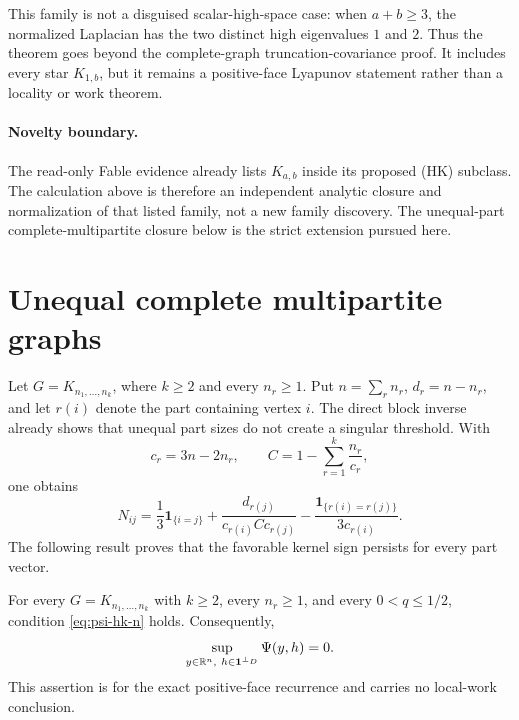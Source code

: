 \documentclass[11pt]{article}
\begin{document}
This family is not a disguised scalar-high-space case: when $a+b\geq3$, the
normalized Laplacian has the two distinct high eigenvalues $1$ and $2$.
Thus the theorem goes beyond the complete-graph truncation-covariance proof.
It includes every star $K_{1,b}$, but it remains a positive-face Lyapunov
statement rather than a locality or work theorem.

\paragraph{Novelty boundary.}
The read-only Fable evidence already lists $K_{a,b}$ inside its proposed
\textup{(HK)} subclass.  The calculation above is therefore an independent
analytic closure and normalization of that listed family, not a new family
discovery.  The unequal-part complete-multipartite closure below is the
strict extension pursued here.

\section{Unequal complete multipartite graphs}

Let $G=K_{n_1,\ldots,n_k}$, where $k\geq2$ and every $n_r\geq1$.  Put
$n=\sum_r n_r$, $d_r=n-n_r$, and let $r(i)$ denote the part containing
vertex $i$.  The direct block inverse already shows that unequal part sizes
do not create a singular threshold.  With
\begin{equation}
 c_r=3n-2n_r,
 \qquad
 C=1-\sum_{r=1}^k\frac{n_r}{c_r},
 \label{eq:psi-kmultipartite-block-parameters}
\end{equation}
one obtains
\begin{equation}
 N_{ij}
 =\frac13\mathbf1_{\{i=j\}}
  +\frac{d_{r(j)}}{c_{r(i)}C c_{r(j)}}
  -\frac{\mathbf1_{\{r(i)=r(j)\}}}{3c_{r(i)}}.
 \label{eq:psi-kmultipartite-block-inverse}
\end{equation}
The following result proves that the favorable kernel sign persists for
every part vector.

\begin{theorem}
\label{thm:psi-complete-multipartite}
For every $G=K_{n_1,\ldots,n_k}$ with $k\geq2$, every $n_r\geq1$, and every
$0<q\leq1/2$, condition \cref{eq:psi-hk-n} holds.  Consequently,
\begin{equation}
 \sup_{y\in\mathbb R^n,\ h\in\one^{\perp_D}}\Psi(y,h)=0.
 \label{eq:psi-complete-multipartite-sup}
\end{equation}
This assertion is for the exact positive-face recurrence and carries no
local-work conclusion.
\end{theorem}
\end{document}
